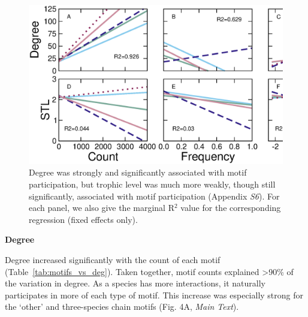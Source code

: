 \documentclass[12pt]{article}
\begin{document}
\begin{spacing}{2.0}
	    \begin{figure}[ht!]
	        \centering
	        \includegraphics[width=\textwidth]{figures/motifs_vs_degTL.eps}
	        \caption{Degree was strongly and significantly associated with motif participation, but trophic level was much more weakly, though still significantly, associated with motif participation (Appendix \emph{S6}). For each panel, we also give the marginal R$^2$ value for the corresponding regression (fixed effects only).}
	        \label{fig:motifs_degTL}
	    \end{figure}


		\textbf{Degree}

			Degree increased significantly with the count of each motif (Table~\ref{tab:motifs_vs_deg}).
			Taken together, motif counts explained \textgreater90\% of the variation in degree. 
			As a species has more interactions, it naturally participates in more of each type of motif.
			This increase was especially strong for the `other' and three-species chain motifs (Fig. 4A, \emph{Main Text}).



\end{spacing}
\end{document}
